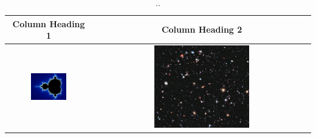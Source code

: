 \begin{table}[tph]
  \centering
  \begin{tabular*}{\textwidth}{@{\extracolsep{\fill}}cc}
  \toprule
  \textbf{Column Heading 1} & \textbf{Column Heading 2} \\
  \midrule
  \includegraphics[width=0.45\textwidth]{images/example1.jpg} & \includegraphics[width=0.45\textwidth]{images/example2.jpg} \\
  \bottomrule
  \end{tabular*}
  \caption{
  ..
  }\label{table:Example}
  \end{table}
